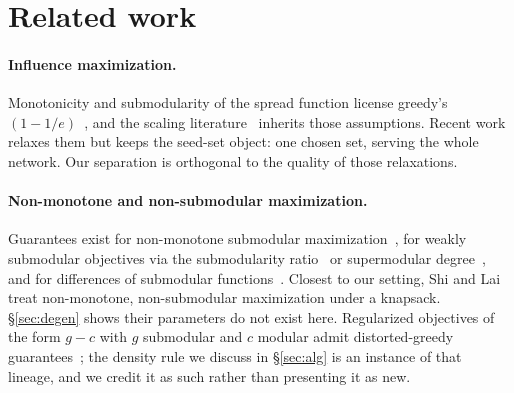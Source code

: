 \documentclass[sigconf,anonymous]{aamas}
\theoremstyle{remark}
\begin{document}
\section{Related work}

\paragraph{Influence maximization.} Monotonicity and submodularity of
the spread function license greedy's $(1-1/e)$~\cite{kempe2003}, and
the scaling literature~\cite{borgs2014,tang2015,eim2025} inherits those
assumptions. Recent work relaxes them but keeps the seed-set object:
one chosen set, serving the whole network. Our separation is orthogonal
to the quality of those relaxations.

\paragraph{Non-monotone and non-submodular maximization.} Guarantees
exist for non-monotone submodular
maximization~\cite{feige2011,buchbinder2012}, for weakly submodular
objectives via the sub\-modu\-larity
ratio~\cite{daskempe2011,daskempe2018} or supermodular
degree~\cite{feigeizsak2013}, and for differences of
submodular functions~\cite{iyerbilmes2012}. Closest to our setting,
Shi and Lai~\cite{shilai2024} treat non-monotone, non-submodular
maximization under a knapsack. \S\ref{sec:degen} shows their
parameters do not exist here. Regularized objectives of the form
$g - c$ with $g$ submodular and $c$ modular admit distorted-greedy
guarantees~\cite{harshaw2019}; the density rule we discuss in
\S\ref{sec:alg} is an instance of that lineage, and we credit it as
such rather than presenting it as new.
\end{document}
